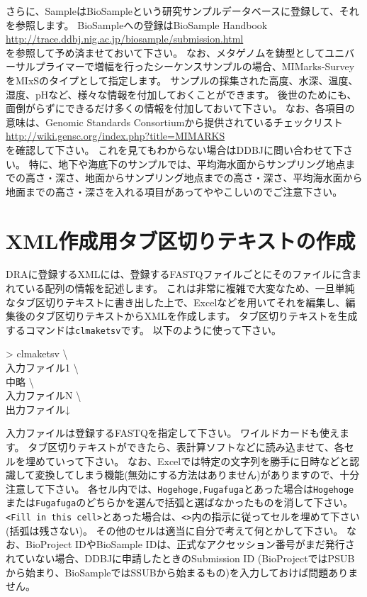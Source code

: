 \documentclass[titlepage,10pt,a4paper]{jsbook}
\newenvironment{cmd}{\begin{oframed}\raggedright\ttfamily\footnotesize\setlength{\baselineskip}{1.4em}}{\end{oframed}\vspace{-1em}}
\begin{document}
さらに、SampleはBioSampleという研究サンプルデータベースに登録して、それを参照します。
BioSampleへの登録はBioSample Handbook\\
\href{http://trace.ddbj.nig.ac.jp/biosample/submission.html}{http://trace.ddbj.nig.ac.jp/biosample/submission.html}\\
を参照して予め済ませておいて下さい。
なお、メタゲノムを鋳型としてユニバーサルプライマーで増幅を行ったシーケンスサンプルの場合、MIMarks-SurveyをMIxSのタイプとして指定します。
サンプルの採集された高度、水深、温度、湿度、pHなど、様々な情報を付加しておくことができます。
後世のためにも、面倒がらずにできるだけ多くの情報を付加しておいて下さい。
なお、各項目の意味は、Genomic Standards Consortiumから提供されているチェックリスト\\
\href{http://wiki.gensc.org/index.php?title=MIMARKS}{http://wiki.gensc.org/index.php?title=MIMARKS}\\
を確認して下さい。
これを見てもわからない場合はDDBJに問い合わせて下さい。
特に、地下や海底下のサンプルでは、平均海水面からサンプリング地点までの高さ・深さ、地面からサンプリング地点までの高さ・深さ、平均海水面から地面までの高さ・深さを入れる項目があってややこしいのでご注意下さい。

\section{XML作成用タブ区切りテキストの作成}

DRAに登録するXMLには、登録するFASTQファイルごとにそのファイルに含まれている配列の情報を記述します。
これは非常に複雑で大変なため、一旦単純なタブ区切りテキストに書き出した上で、Excelなどを用いてそれを編集し、編集後のタブ区切りテキストからXMLを作成します。
タブ区切りテキストを生成するコマンドは\texttt{clmaketsv}です。
以下のように使って下さい。

\begin{cmd}
{\textgreater} clmaketsv {\textbackslash}\\
入力ファイル1 {\textbackslash}\\
中略 {\textbackslash}\\
入力ファイルN {\textbackslash}\\
出力ファイル↓
\end{cmd}

入力ファイルは登録するFASTQを指定して下さい。
ワイルドカードも使えます。
タブ区切りテキストができたら、表計算ソフトなどに読み込ませて、各セルを埋めていって下さい。
なお、Excelでは特定の文字列を勝手に日時などと認識して変換してしまう機能(無効にする方法はありません)がありますので、十分注意して下さい。
各セル内では、\texttt{{\lbrack}Hogehoge,Fugafuga{\rbrack}}とあった場合は\texttt{Hogehoge}または\texttt{Fugafuga}のどちらかを選んで括弧と選ばなかったものを消して下さい。
\texttt{{\textless}Fill in this cell{\textgreater}}とあった場合は、\texttt{{\textless}{\textgreater}}内の指示に従ってセルを埋めて下さい(括弧は残さない)。
その他のセルは適当に自分で考えて何とかして下さい。
なお、BioProject IDやBioSample IDは、正式なアクセッション番号がまだ発行されていない場合、DDBJに申請したときのSubmission ID (BioProjectではPSUBから始まり、BioSampleではSSUBから始まるもの)を入力しておけば問題ありません。
\end{document}
